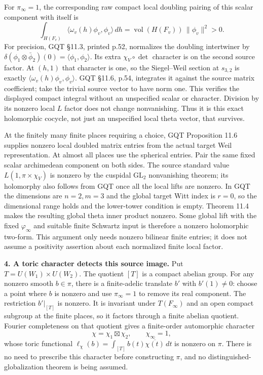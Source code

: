 For \(\pi_\infty=1\), the corresponding raw compact local doubling pairing of this scalar component with itself is \[
\int_{H(F_v)}\langle\omega_v(h)\phi_v,\phi_v\rangle\,dh
=\operatorname{vol}(H(F_v))\,\|\phi_v\|^2>0.
\] For precision, GQT §11.3, printed p.52, normalizes the doubling intertwiner by \(\delta(\phi_1\otimes\bar\phi_2)(0)=\langle\phi_1,\phi_2\rangle\). Its extra \(\chi_V\circ\det\) character is on the second source factor. At \((h,1)\) that character is one, so the Siegel--Weil section at \(s_{3,2}\) is exactly \(\langle\omega_v(h)\phi_v,\phi_v\rangle\). GQT §11.6, p.54, integrates it against the source matrix coefficient; take the trivial source vector to have norm one. This verifies the displayed compact integral without an unspecified scalar or character. Division by its nonzero local \(L\) factor does not change nonvanishing. Thus it is this exact holomorphic cocycle, not just an unspecified local theta vector, that survives.

At the finitely many finite places requiring a choice, GQT Proposition 11.6 supplies nonzero local doubled matrix entries from the actual target Weil representation. At almost all places use the spherical entries. Pair the same fixed scalar archimedean component on both sides. The source standard value \(L(1,\pi\times\chi_V)\) is nonzero by the cuspidal \(\mathrm{GL}_2\) nonvanishing theorem; its holomorphy also follows from GQT once all the local lifts are nonzero. In GQT the dimensions are \(n=2,m=3\) and the global target Witt index is \(r=0\), so the dimensional range holds and the lower-tower condition is empty. Theorem 11.4 makes the resulting global theta inner product nonzero. Some global lift with the fixed \(\varphi_\infty\) and suitable finite Schwartz input is therefore a nonzero holomorphic two-form. This argument only needs nonzero bilinear finite entries; it does not assume a positivity assertion about each normalized finite local factor.

\textbf{4. A toric character detects this source image.} Put \(T=U(W_1)\times U(W_2)\). The quotient \([T]\) is a compact abelian group. For any nonzero smooth \(b\in\pi\), there is a finite-adelic translate \(b'\) with \(b'(1)\ne0\): choose a point where \(b\) is nonzero and use \(\pi_\infty=1\) to remove its real component. The restriction \(b'|_{[T]}\) is nonzero. It is invariant under \(T(F_\infty)\) and an open compact subgroup at the finite places, so it factors through a finite abelian quotient. Fourier completeness on that quotient gives a finite-order automorphic character \[
\chi=\chi_1\boxtimes\chi_2,\qquad \chi_\infty=1,
\] whose toric functional \(\ell_\chi(b)=\int_{[T]}b(t)\overline{\chi(t)}\,dt\) is nonzero on \(\pi\). There is no need to prescribe this character before constructing \(\pi\), and no distinguished-globalization theorem is being assumed.

